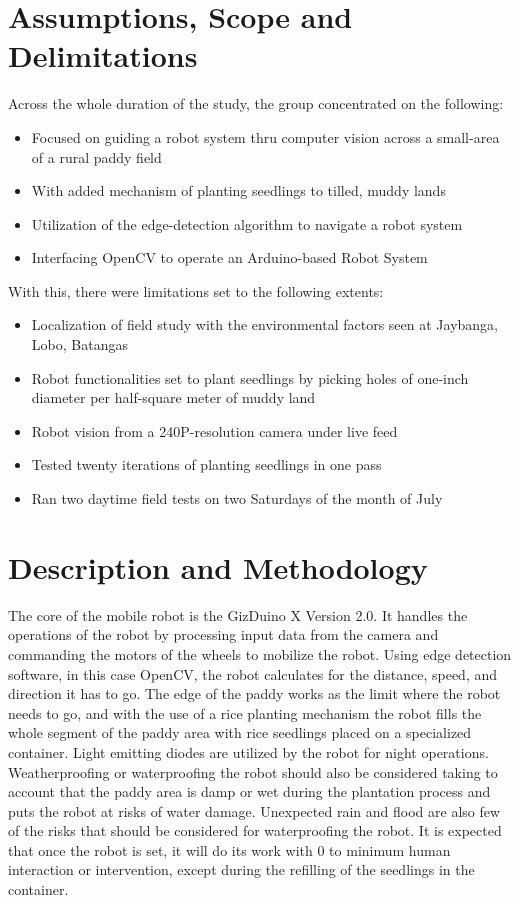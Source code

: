 \section{Assumptions, Scope and Delimitations}
Across the whole duration of the study, the group concentrated on the following:
\begin{itemize}
\item Focused on guiding a robot system thru computer vision across a small-area of a rural paddy field
\item With added mechanism of planting seedlings to tilled, muddy lands
\item Utilization of the edge-detection algorithm to navigate a robot system
\item Interfacing OpenCV to operate an Arduino-based Robot System
\end{itemize}
 
With this, there were limitations set to the following extents:
\begin{itemize}
\item Localization of field study with the environmental factors seen at Jaybanga, Lobo, Batangas
\item Robot functionalities set to plant seedlings by picking holes of one-inch diameter per half-square meter of muddy land
\item Robot vision from a 240P-resolution camera under live feed
\item Tested twenty iterations of planting seedlings in one pass
\item Ran two daytime field tests on two Saturdays of the month of July
\end{itemize}

\section{Description and Methodology}

	The core of the mobile robot is the GizDuino X Version 2.0. It handles the operations of the robot by processing input data from the camera and commanding the motors of the wheels to mobilize the robot. Using edge detection software, in this case OpenCV, the robot calculates for the distance, speed, and direction it has to go. The edge of the paddy works as the limit where the robot needs to go, and with the use of a rice planting mechanism the robot fills the whole segment of the paddy area with rice seedlings placed on a specialized container. Light emitting diodes are utilized by the robot for night operations. Weatherproofing or waterproofing the robot should also be considered taking to account that the paddy area is damp or wet during the plantation process and puts the robot at risks of water damage. Unexpected rain and flood are also few of the risks that should be considered for waterproofing the robot. It is expected that once the robot is set, it will do its work with 0 to minimum human interaction or intervention, except during the refilling of the seedlings in the container. 
 

